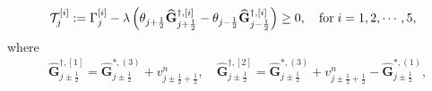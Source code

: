 \documentclass[times,final,11pt]{elsarticle}
\numberwithin{equation}{section}
\theoremstyle{definition}
\theoremstyle{remark}
\begin{document}
\begin{enumerate}[label=(\roman*),leftmargin=6mm]
	\begin{equation}\label{step1}
	    \begin{aligned}
	    	\mathcal{T}_j^{[i]} := \Gamma_j^{[i]} - \lambda \left( \theta_{j + \frac{1}{2}} \widehat{\mathbf{G}}_{j + \frac{1}{2}}^{\dag,[i]} - \theta_{j - \frac{1}{2}} \widehat{\mathbf{G}}_{j - \frac{1}{2}}^{\dag,[i]} \right) \geq 0, \quad {\rm for} \; i = 1, 2, \cdots, 5,
	    \end{aligned}
	\end{equation}
	where 
	\begin{equation*}
		\begin{aligned}
			&\widehat{\mathbf{G}}_{j \pm \frac{1}{2}}^{\dag,[1]} = \widehat{\mathbf{G}}_{j \pm \frac{1}{2}}^{*,(3)} + v_{j \pm \frac12 + \frac12}^n, \quad 
			\widehat{\mathbf{G}}_{j \pm \frac{1}{2}}^{\dag,[2]} = \widehat{\mathbf{G}}_{j \pm \frac{1}{2}}^{*,(3)} + v_{j \pm \frac12 + \frac12}^n - \widehat{\mathbf{G}}_{j \pm \frac{1}{2}}^{*,(1)}, \\

\end{aligned}
\end{equation*}
\end{enumerate}
\end{document}
